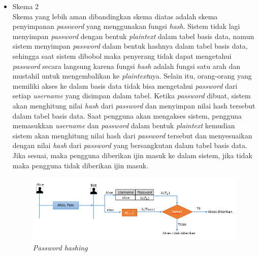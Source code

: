 \begin{itemize}
	\item Skema 2\\
	Skema yang lebih aman dibandingkan skema diatas adalah skema penyimpanan \textit{password} yang menggunakan fungsi \textit{hash}. Sistem tidak lagi menyimpan \textit{password} dengan bentuk \textit{plaintext} dalam tabel basis data, namun sistem menyimpan \textit{password} dalam bentuk hashnya dalam tabel basis data, sehingga saat sistem dibobol maka penyerang tidak dapat mengetahui \textit{password} secara langsung karena fungsi \textit{hash} adalah fungsi satu arah dan mustahil untuk mengembalikan ke \textit{plaintext}nya. Selain itu, orang-orang yang memiliki akses ke dalam basis data tidak bisa mengetahui \textit{password} dari setiap \textit{username} yang disimpan dalam tabel. Ketika \textit{password} dibuat, sistem akan menghitung nilai \textit{hash} dari \textit{password} dan menyimpan nilai hash tersebut dalam tabel basis data.
Saat pengguna akan mengakses sistem, pengguna memasukkan \textit{username} dan \textit{password} dalam bentuk \textit{plaintext} kemudian sistem akan menghitung nilai hash dari \textit{password} tersebut dan menyesuaikan dengan nilai \textit{hash} dari \textit{password} yang bersangkutan dalam tabel basis data. Jika sesuai, maka pengguna diberikan ijin masuk ke dalam sistem, jika tidak maka pengguna tidak diberikan ijin masuk.
	\begin{figure}[H]
		\includegraphics[scale=0.7]{Gambar/password_2}
		\centering
		\caption{\textit{Password hashing}}
	\end{figure}
	

\end{itemize}
